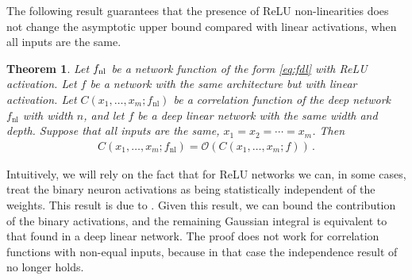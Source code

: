 \documentclass[english]{article}
\newtheorem{thm}{Theorem}
\newcommand{\cO}{\ensuremath{\mathcal{O}}}
\newcommand{\fnl}{f_{\mathrm{nl}}}
\newcommand{\pcite}[1]{\cite{#1}}
\begin{document}
\newcommand{\hW}{\hat{W}}
\newcommand{\hU}{\hat{U}}
\newcommand{\hV}{\hat{V}}
\newcommand{\hD}{\hat{D}}

The following result guarantees that the presence of ReLU non-linearities does not change the asymptotic upper bound compared with linear activations, when all inputs are the same.
\begin{thm}\label{thm:deep_relu}
  Let $f_{\rm nl}$ be a network function of the form \eqref{eq:fdl} with ReLU activation.
  Let $f$ be a network with the same architecture but with linear activation.
  Let $C(x_1,\dots,x_m;\fnl)$ be a correlation function of the deep network $\fnl$ with width $n$, and let $f$ be a deep linear network with the same width and depth.
  Suppose that all inputs are the same, $x_1 = x_2 = \cdots = x_m$.
  Then
  \begin{align}
    C(x_1,\dots,x_m;\fnl) = \cO(C(x_1,\dots,x_m;f)) \,.
  \end{align}
\end{thm}
Intuitively, we will rely on the fact that for ReLU networks we can, in some cases, treat the binary neuron activations as being statistically independent of the weights.
This result is due to \pcite{hanin2018products}.
Given this result, we can bound the contribution of the binary activations, and the remaining Gaussian integral is equivalent to that found in a deep linear network.
The proof does not work for correlation functions with non-equal inputs, because in that case the independence result of \cite{hanin2018products} no longer holds.
\end{document}
